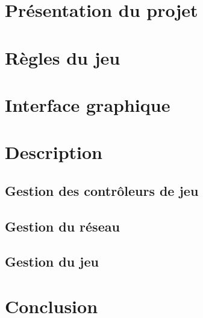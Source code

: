 \section*{Présentation du projet}


\section{Règles du jeu}


\section{Interface graphique}

	

\section{Description}

	\subsection{Gestion des contrôleurs de jeu}
	
	\subsection{Gestion du réseau}
	
	\subsection{Gestion du jeu}
	

\section*{Conclusion}

